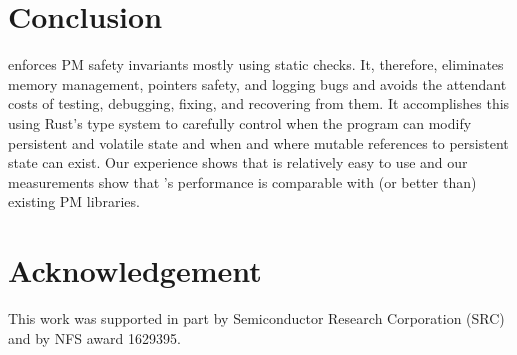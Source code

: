 \section{Conclusion}
\label{sec:conclude}

\This{} enforces PM safety invariants mostly using static checks.  It,
therefore, eliminates memory management, pointers safety, and logging bugs and
avoids the attendant costs of testing, debugging, fixing, and recovering from
them.  It accomplishes this using Rust's type system to carefully control when
the program can modify persistent and volatile state and when and where mutable
references to persistent state can exist.  Our experience shows that \this{} is
relatively easy to use and our measurements show that \this{}'s performance is
comparable with (or better than) existing PM libraries.

\section*{Acknowledgement}

This work was supported in part by Semiconductor Research Corporation (SRC)
and by NFS award 1629395.